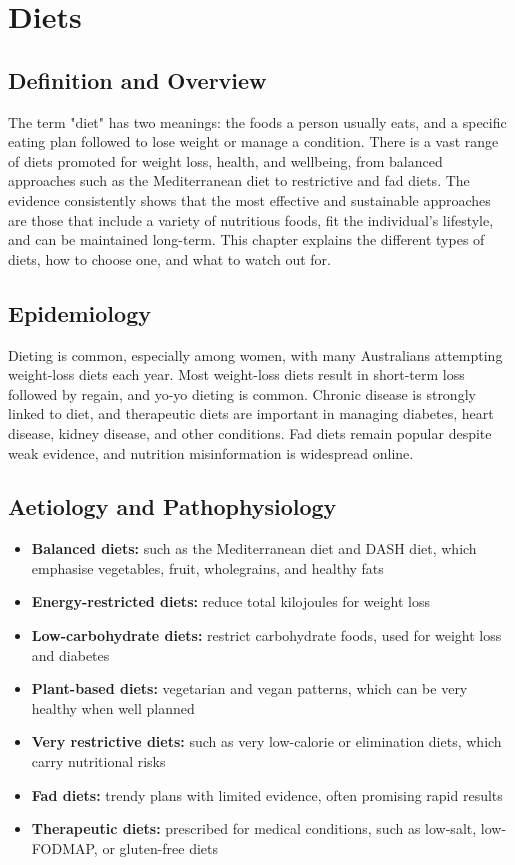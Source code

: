 \chapter{Diets}

\section*{Definition and Overview}
The term "diet" has two meanings: the foods a person usually eats, and a specific eating plan followed to lose weight or manage a condition. There is a vast range of diets promoted for weight loss, health, and wellbeing, from balanced approaches such as the Mediterranean diet to restrictive and fad diets. The evidence consistently shows that the most effective and sustainable approaches are those that include a variety of nutritious foods, fit the individual's lifestyle, and can be maintained long-term. This chapter explains the different types of diets, how to choose one, and what to watch out for.

\section*{Epidemiology}
Dieting is common, especially among women, with many Australians attempting weight-loss diets each year. Most weight-loss diets result in short-term loss followed by regain, and yo-yo dieting is common. Chronic disease is strongly linked to diet, and therapeutic diets are important in managing diabetes, heart disease, kidney disease, and other conditions. Fad diets remain popular despite weak evidence, and nutrition misinformation is widespread online.

\section*{Aetiology and Pathophysiology}
\begin{itemize}
    \item \textbf{Balanced diets:} such as the Mediterranean diet and DASH diet, which emphasise vegetables, fruit, wholegrains, and healthy fats
    \item \textbf{Energy-restricted diets:} reduce total kilojoules for weight loss
    \item \textbf{Low-carbohydrate diets:} restrict carbohydrate foods, used for weight loss and diabetes
    \item \textbf{Plant-based diets:} vegetarian and vegan patterns, which can be very healthy when well planned
    \item \textbf{Very restrictive diets:} such as very low-calorie or elimination diets, which carry nutritional risks
    \item \textbf{Fad diets:} trendy plans with limited evidence, often promising rapid results
    \item \textbf{Therapeutic diets:} prescribed for medical conditions, such as low-salt, low-FODMAP, or gluten-free diets
\end{itemize}

